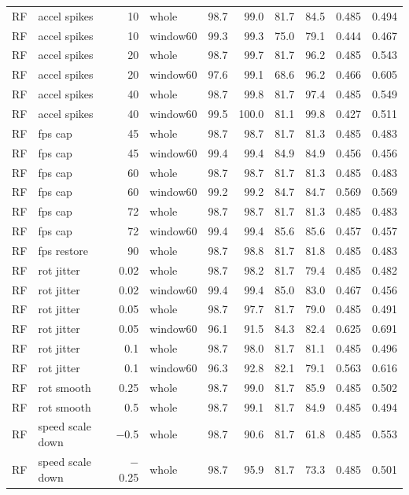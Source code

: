 \begin{longtable}{llrlrrrrrr}
RF & accel spikes & 10 & whole & 98.7 & 99.0 & 81.7 & 84.5 & 0.485 & 0.494 \\
RF & accel spikes & 10 & window60 & 99.3 & 99.3 & 75.0 & 79.1 & 0.444 & 0.467 \\
RF & accel spikes & 20 & whole & 98.7 & 99.7 & 81.7 & 96.2 & 0.485 & 0.543 \\
RF & accel spikes & 20 & window60 & 97.6 & 99.1 & 68.6 & 96.2 & 0.466 & 0.605 \\
RF & accel spikes & 40 & whole & 98.7 & 99.8 & 81.7 & 97.4 & 0.485 & 0.549 \\
RF & accel spikes & 40 & window60 & 99.5 & 100.0 & 81.1 & 99.8 & 0.427 & 0.511 \\
RF & fps cap & 45 & whole & 98.7 & 98.7 & 81.7 & 81.3 & 0.485 & 0.483 \\
RF & fps cap & 45 & window60 & 99.4 & 99.4 & 84.9 & 84.9 & 0.456 & 0.456 \\
RF & fps cap & 60 & whole & 98.7 & 98.7 & 81.7 & 81.3 & 0.485 & 0.483 \\
RF & fps cap & 60 & window60 & 99.2 & 99.2 & 84.7 & 84.7 & 0.569 & 0.569 \\
RF & fps cap & 72 & whole & 98.7 & 98.7 & 81.7 & 81.3 & 0.485 & 0.483 \\
RF & fps cap & 72 & window60 & 99.4 & 99.4 & 85.6 & 85.6 & 0.457 & 0.457 \\
RF & fps restore & 90 & whole & 98.7 & 98.8 & 81.7 & 81.8 & 0.485 & 0.483 \\
RF & rot jitter & 0.02 & whole & 98.7 & 98.2 & 81.7 & 79.4 & 0.485 & 0.482 \\
RF & rot jitter & 0.02 & window60 & 99.4 & 99.4 & 85.0 & 83.0 & 0.467 & 0.456 \\
RF & rot jitter & 0.05 & whole & 98.7 & 97.7 & 81.7 & 79.0 & 0.485 & 0.491 \\
RF & rot jitter & 0.05 & window60 & 96.1 & 91.5 & 84.3 & 82.4 & 0.625 & 0.691 \\
RF & rot jitter & 0.1 & whole & 98.7 & 98.0 & 81.7 & 81.1 & 0.485 & 0.496 \\
RF & rot jitter & 0.1 & window60 & 96.3 & 92.8 & 82.1 & 79.1 & 0.563 & 0.616 \\
RF & rot smooth & 0.25 & whole & 98.7 & 99.0 & 81.7 & 85.9 & 0.485 & 0.502 \\
RF & rot smooth & 0.5 & whole & 98.7 & 99.1 & 81.7 & 84.9 & 0.485 & 0.494 \\
RF & speed scale down & $-$0.5 & whole & 98.7 & 90.6 & 81.7 & 61.8 & 0.485 & 0.553 \\
RF & speed scale down & $-$0.25 & whole & 98.7 & 95.9 & 81.7 & 73.3 & 0.485 & 0.501 \\

\end{longtable}
